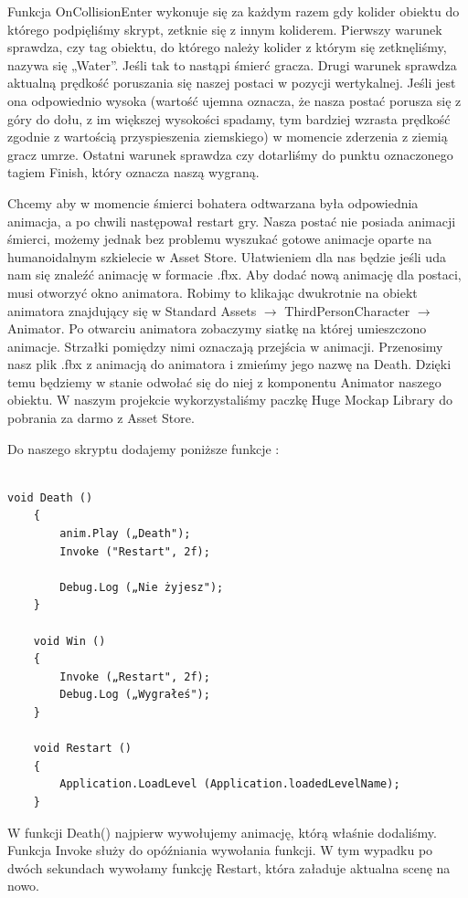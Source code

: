 \documentclass[12pt]{xmgr}
\begin{document}
Funkcja OnCollisionEnter wykonuje się za każdym razem gdy kolider obiektu do którego podpięliśmy skrypt, zetknie się z innym koliderem. Pierwszy warunek sprawdza, czy tag obiektu, do którego należy kolider z którym się zetknęliśmy, nazywa się „Water”. Jeśli tak to nastąpi śmierć gracza. Drugi warunek sprawdza aktualną prędkość poruszania się naszej postaci w pozycji wertykalnej. Jeśli jest ona odpowiednio wysoka (wartość ujemna oznacza, że nasza postać porusza się z góry do dołu, z im większej wysokości spadamy, tym bardziej wzrasta prędkość zgodnie z wartością przyspieszenia ziemskiego) w momencie zderzenia z ziemią gracz umrze. Ostatni warunek sprawdza czy dotarliśmy do punktu oznaczonego tagiem Finish, który oznacza naszą wygraną.

Chcemy aby w momencie śmierci bohatera odtwarzana była odpowiednia animacja, a po chwili następował restart gry. Nasza postać nie posiada animacji śmierci, możemy jednak bez problemu wyszukać gotowe animacje oparte na humanoidalnym szkielecie w Asset Store. Ułatwieniem dla nas będzie jeśli uda nam się znaleźć animację w formacie .fbx. Aby dodać nową animację dla postaci, musi otworzyć okno animatora. Robimy to klikając dwukrotnie na obiekt animatora znajdujący się w Standard Assets $\rightarrow$ ThirdPersonCharacter $\rightarrow$ Animator. Po otwarciu animatora zobaczymy siatkę na której umieszczono animacje. Strzałki pomiędzy nimi oznaczają przejścia w animacji. Przenosimy nasz plik .fbx z animacją do animatora i zmieńmy jego nazwę na Death. Dzięki temu będziemy w stanie odwołać się do niej z komponentu Animator naszego obiektu.
W naszym projekcie wykorzystaliśmy paczkę Huge Mockap Library do pobrania za darmo z Asset Store.

Do naszego skryptu dodajemy poniższe funkcje :

\begin{lstlisting}

void Death ()
    {
        anim.Play („Death");
        Invoke ("Restart", 2f);

        Debug.Log („Nie żyjesz");
    }

    void Win ()
    {
        Invoke („Restart", 2f);
        Debug.Log („Wygrałeś");
    }

    void Restart ()
    {
        Application.LoadLevel (Application.loadedLevelName);
    }

\end{lstlisting}

W funkcji Death() najpierw wywołujemy animację, którą właśnie dodaliśmy.
Funkcja Invoke służy do opóźniania wywołania funkcji. W tym wypadku po dwóch sekundach wywołamy funkcję Restart, która załaduje aktualna scenę na nowo.
\end{document}
